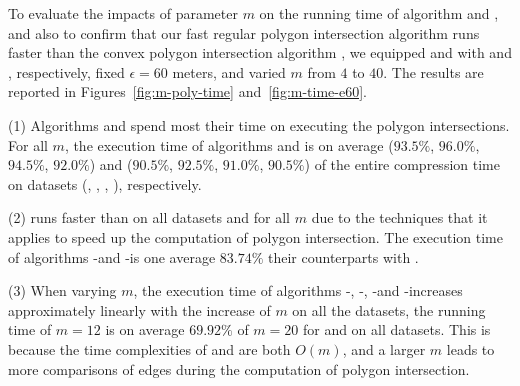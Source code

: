 {%
%

To evaluate the impacts of parameter $m$ on the running time of algorithm \cist and \cista,
 and also to confirm that our fast regular polygon intersection algorithm \rpia runs faster than the convex polygon intersection algorithm \cpia,
we equipped \cist and \cista with \rpia and \cpia, respectively, fixed $\epsilon =60$ meters, and varied $m$ from $4$ to $40$.
%
The results are reported in Figures~\ref{fig:m-poly-time} and~\ref{fig:m-time-e60}.

\ni(1) Algorithms \cist and \cista spend most their time on executing the
polygon intersections. For all $m$, the execution time of algorithms \cpia and
\rpia is on average {($93.5\%$, $96.0\%$, $94.5\%$, $92.0\%$)
	and ($90.5\%$, $92.5\%$, $91.0\%$, $90.5\%$)} of the entire compression  time on {datasets}
(\sercar, \geolife, \mopsi, \pricar), respectively.

\ni(2) \rpia runs faster than \cpia on all datasets and for all $m$ {due to the techniques that it applies to speed up
the computation of polygon intersection}. The execution time of algorithms \cist-\rpia and \cista-\rpia is one average $83.74\%$ their counterparts with \cpia.

\ni(3) When varying $m$, the execution time of algorithms \cist-\rpia, \cist-\cpia, \cista-\rpia and \cista-\cpia increases approximately linearly with the increase of $m$ on all the datasets, {\eg the running time of $m=12$ is on average $69.92\%$ of $m=20$ for \cist and \cista on all datasets. This is because the time complexities of \rpia and \cpia are both $O(m)$, and a larger $m$ leads to more comparisons of edges during the computation of  polygon intersection.}




}
